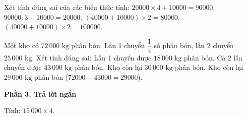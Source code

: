 \begin{ex} %
Xét tính đúng sai của các biểu thức tính:
\choiceTF
{\True $20000 \times 4 + 10000 = 90000$.}
{\True $90000 : 3 - 10000 = 20000$.}
{$(40000 + 10000) \times 2 = 80000$.}
{\True $(40000 + 10000) \times 2 = 100000$.}
\end{ex}

\begin{ex} %
Một kho có $72\,000\text{ kg}$ phân bón. Lần 1 chuyển $\dfrac{1}{4}$ số phân bón, lần 2 chuyển $25\,000\text{ kg}$. Xét tính đúng sai:
\choiceTF
{\True Lần 1 chuyển được $18\,000\text{ kg}$ phân bón.}
{\True Cả 2 lần chuyển được $43\,000\text{ kg}$ phân bón.}
{Kho còn lại $30\,000\text{ kg}$ phân bón.}
{\True Kho còn lại $29\,000\text{ kg}$ phân bón ($72000 - 43000 = 29000$).}
\end{ex}

\textbf{Phần 3. Trả lời ngắn}

\begin{ex} %
Tính: $15\,000 \times 4$.
\end{ex}

